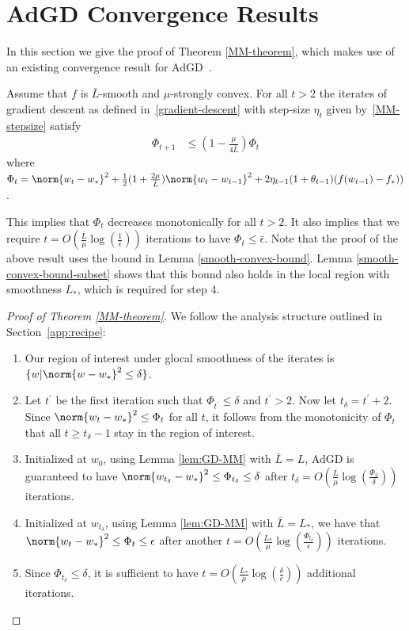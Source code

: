 \documentclass[10pt]{article} %
\newif\ifextended
\begin{document}
\ifextended
\section{AdGD Convergence Results}\label{MM-proof}
In this section we give the proof of Theorem \ref{MM-theorem}, which makes use of an existing convergence result for AdGD~\cite[Theorem~2]{MalitskyM20}. 
\begin{lemma}
\label{lem:GD-MM}
Assume that $f$ is $\bar{L}$-smooth and $\mu$-strongly convex. For all $t > 2$ the iterates of gradient descent as defined in~\eqref{gradient-descent} with step-size $\eta_t$ given by~\eqref{MM-stepsize} satisfy
    \begin{align*}
        \Phi_{t+1}
        &\leq \left(1 - \frac{\mu}{4\bar{L}}\right)\Phi_{t}
    \end{align*}  
    where $\Phi_{t} = \norm{w_{t} - w_*}^2 + \frac{1}{2}(1 + \frac{2\mu}{\bar{L}})\norm{w_{t} - w_{t-1}}^2 + 2\eta_{t-1}(1 + \theta_{t-1})(f(w_{t-1}) - f_*))$.
\end{lemma}
This implies that $\Phi_{t}$ decreases monotonically for all $t > 2$. It also implies that we require $t = O\left(\frac{\bar{L}}{\mu}\log\left(\frac{1}{\bar{\epsilon}}\right)\right)$ iterations to have $\Phi_{t} \leq \bar{\epsilon}$. Note that the proof of the above result uses the bound in Lemma \ref{smooth-convex-bound}. Lemma \ref{smooth-convex-bound-subset} shows that this bound also holds in the local region with smoothness $L_{*}$, which is required for step 4.
\begin{proof}[Proof of Theorem \ref{MM-theorem}]
We follow the analysis structure outlined in Section~\ref{app:recipe}:
    \begin{enumerate}
    \item Our region of interest under glocal smoothness of the iterates is $\{w \vert \norm{w - w_*}^2 \leq \delta \}$.
    \item Let $t^{'}$ be the first iteration such that $\Phi_{t^{'}} \leq \delta$ and $t^{'} > 2$. Now let $t_\delta = t^{'} + 2$. Since $\norm{w_{t} - w_*}^2 \leq \Phi_{t}$ for all $t$, it follows from the monotonicity of $\Phi_{t}$ that all $t\geq t_\delta - 1$ stay in the region of interest.
    \item Initialized at $w_0$, using Lemma \ref{lem:GD-MM} with $\bar{L} = L$, AdGD is guaranteed to have $\norm{w_{t_\delta} - w_*}^2 \leq \Phi_{t_\delta} \leq \delta$ after $t_\delta = O\left(\frac{L}{\mu}\log\left(\frac{\Phi_{3}}{\delta}\right)\right)$ iterations.
    \item Initialized at $w_{t_\delta}$, using Lemma \ref{lem:GD-MM} with $\bar{L} = L_{*}$, we have that $\norm{w_{t} - w_*}^2 \leq \Phi_{t} \leq \epsilon$ after another $t = O\left(\frac{L_{*}}{\mu}\log\left(\frac{\Phi_{t_{\delta}}}{\epsilon}\right)\right)$ iterations.
    \item Since $\Phi_{t_{\delta}} \leq \delta$, it is sufficient to have $t = O\left(\frac{L_{*}}{\mu}\log\left(\frac{\delta}{\epsilon}\right)\right)$ additional iterations.
    \end{enumerate}
\end{proof}
\end{document}
